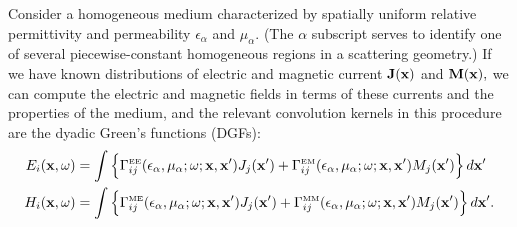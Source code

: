 \documentclass[letterpaper]{article}
\begin{document}
Consider a homogeneous medium characterized by spatially uniform 
relative permittivity and permeability $\epsilon_\alpha$ and 
$\mu_\alpha$. (The $\alpha$ subscript serves to identify one of 
several piecewise-constant homogeneous regions in a \lss scattering 
geometry.) 
If we have
known distributions of electric and magnetic current
$\mathbf{J}(\mathbf{x})$ and $\mathbf{M}(\mathbf{x}),$
we can compute the electric and magnetic fields in terms
of these currents and the properties of the medium, and  
the relevant convolution kernels in this procedure are
the dyadic Green's functions (DGFs):
\begin{align*}
 E_i(\mathbf{x}, \omega) 
&= 
   \int
    \Big\{
     \Gamma^{\hbox{\tiny{EE}}}_{ij}(\epsilon_\alpha, \mu_\alpha; \omega; \mathbf{x}, \mathbf{x}^\prime) 
     J_j(\mathbf{x}^\prime)
     +
     \Gamma^{\hbox{\tiny{EM}}}_{ij}(\epsilon_\alpha, \mu_\alpha; \omega; \mathbf{x}, \mathbf{x}^\prime) 
     M_j(\mathbf{x}^\prime)
    \Big\}
    \, d\mathbf{x}^\prime
\\
 H_i(\mathbf{x}, \omega) 
&= 
   \int
    \Big\{
     \Gamma^{\hbox{\tiny{ME}}}_{ij}(\epsilon_\alpha, \mu_\alpha; \omega; \mathbf{x}, \mathbf{x}^\prime) 
     J_j(\mathbf{x}^\prime)
     +
     \Gamma^{\hbox{\tiny{MM}}}_{ij}(\epsilon_\alpha, \mu_\alpha; \omega; \mathbf{x}, \mathbf{x}^\prime) 
     M_j(\mathbf{x}^\prime)
    \Big\}
    \, d\mathbf{x}^\prime.
\end{align*}
\end{document}
